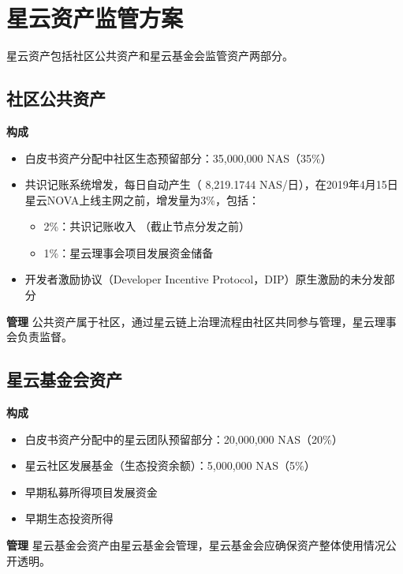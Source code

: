 \section{星云资产监管方案}
星云资产包括社区公共资产和星云基金会监管资产两部分。
\subsection{社区公共资产}
\textbf{构成}

\begin{itemize}
	\item 白皮书资产分配中社区生态预留部分：35,000,000 NAS（35\%）
    \item 共识记账系统增发，每日自动产生（ 8,219.1744 NAS/日），在2019年4月15日星云NOVA上线主网之前，增发量为3\%，包括：
	    \begin{itemize}
			\item 2\%：共识记账收入 （截止节点分发之前）
			\item 1\%：星云理事会项目发展资金储备
		\end{itemize}
	\item 开发者激励协议（Developer Incentive Protocol，DIP）原生激励的未分发部分
\end{itemize}
\textbf{管理}
公共资产属于社区，通过星云链上治理流程由社区共同参与管理，星云理事会负责监督。

\subsection{星云基金会资产}
\textbf{构成}

\begin{itemize}
	\item 白皮书资产分配中的星云团队预留部分：20,000,000 NAS（20\%）
    \item 星云社区发展基金（生态投资余额）：5,000,000 NAS（5\%）
	\item 早期私募所得项目发展资金
	\item 早期生态投资所得
\end{itemize}
\textbf{管理}
星云基金会资产由星云基金会管理，星云基金会应确保资产整体使用情况公开透明。

